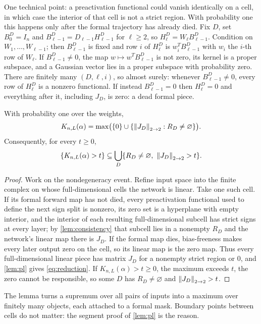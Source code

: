 One technical point: a preactivation functional could vanish identically on a cell, in which case the interior of that cell is not a strict region. With probability one this happens only after the formal trajectory has already died. Fix $D$, set $B^D_0=I_n$ and $B^D_{\ell-1}=D_{\ell-1}H^D_{\ell-1}$ for $\ell\ge 2$, so $H^D_\ell=W_\ell B^D_{\ell-1}$. Condition on $W_1,\dots,W_{\ell-1}$; then $B^D_{\ell-1}$ is fixed and row $i$ of $H^D_\ell$ is $w_i^TB^D_{\ell-1}$ with $w_i$ the $i$-th row of $W_\ell$. If $B^D_{\ell-1}\ne 0$, the map $w\mapsto w^TB^D_{\ell-1}$ is not zero, its kernel is a proper subspace, and a Gaussian vector lies in a proper subspace with probability zero. There are finitely many $(D,\ell,i)$, so almost surely: whenever $B^D_{\ell-1}\ne 0$, every row of $H^D_\ell$ is a nonzero functional. If instead $B^D_{\ell-1}=0$ then $H^D_\ell=0$ and everything after it, including $J_D$, is zero: a dead formal piece.

\begin{lemma}\label{lem:reduction}
With probability one over the weights,
\begin{equation}\label{eq:reduction}
K_{n,L}(\alpha)=\max\bigl(\{0\}\cup\{\left\lVert J_D\right\rVert_{2\to 2}:R_D\ne\varnothing\}\bigr).
\end{equation}
Consequently, for every $t\ge 0$,
\begin{equation}\label{eq:reduction-event}
\{K_{n,L}(\alpha)>t\}\subseteq\bigcup_D\{R_D\ne\varnothing,\ \op{J_D}>t\}.
\end{equation}
\end{lemma}

\begin{proof}
Work on the nondegeneracy event. Refine input space into the finite complex on whose full-dimensional cells the network is linear. Take one such cell. If its formal forward map has not died, every preactivation functional used to define the next sign split is nonzero, its zero set is a hyperplane with empty interior, and the interior of each resulting full-dimensional subcell has strict signs at every layer; by \cref{lem:consistency} that subcell lies in a nonempty $R_D$ and the network's linear map there is $J_D$. If the formal map dies, bias-freeness makes every later output zero on the cell, so its linear map is the zero map. Thus every full-dimensional linear piece has matrix $J_D$ for a nonempty strict region or $0$, and \cref{lem:pl} gives \cref{eq:reduction}. If $K_{n,L}(\alpha)>t\ge 0$, the maximum exceeds $t$, the zero cannot be responsible, so some $D$ has $R_D\ne\varnothing$ and $\left\lVert J_D\right\rVert_{2\to 2}>t$.
\end{proof}

The lemma turns a supremum over all pairs of inputs into a maximum over finitely many objects, each attached to a formal mask. Boundary points between cells do not matter: the segment proof of \cref{lem:pl} is the reason.
